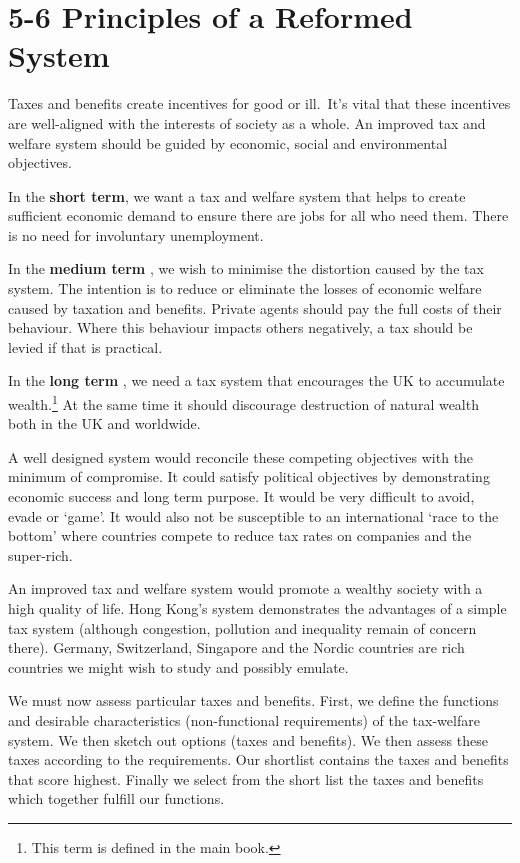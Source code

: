\documentclass[]{tufte-handout}
\begin{document}
\hypertarget{principles-of-a-reformed-system}{%
\section{5-6 Principles of a Reformed
System}\label{principles-of-a-reformed-system}}

Taxes and benefits create incentives for good or ill.~It's vital that
these incentives are well-aligned with the interests of society as a
whole. An improved tax and welfare system should be guided by economic,
social and environmental objectives.

In the \textbf{short term}, we want a tax and welfare system that helps
to create sufficient economic demand to ensure there are jobs for all
who need them. There is no need for involuntary unemployment.

In the \textbf{medium term} , we wish to minimise the distortion caused
by the tax system. The intention is to reduce or eliminate the losses of
economic welfare caused by taxation and benefits. Private agents should
pay the full costs of their behaviour. Where this behaviour impacts
others negatively, a tax should be levied if that is practical.

In the \textbf{long term} , we need a tax system that encourages the UK
to accumulate wealth.\footnote{This term is defined in the main book.}
At the same time it should discourage destruction of natural wealth both
in the UK and worldwide.

A well designed system would reconcile these competing objectives with
the minimum of compromise. It could satisfy political objectives by
demonstrating economic success and long term purpose. It would be very
difficult to avoid, evade or `game'. It would also not be susceptible to
an international `race to the bottom' where countries compete to reduce
tax rates on companies and the super-rich.

An improved tax and welfare system would promote a wealthy society with
a high quality of life. Hong Kong's system demonstrates the advantages
of a simple tax system (although congestion, pollution and inequality
remain of concern there). Germany, Switzerland, Singapore and the Nordic
countries are rich countries we might wish to study and possibly
emulate.

We must now assess particular taxes and benefits. First, we define the
functions and desirable characteristics (non-functional requirements) of
the tax-welfare system. We then sketch out options (taxes and benefits).
We then assess these taxes according to the requirements. Our shortlist
contains the taxes and benefits that score highest. Finally we select
from the short list the taxes and benefits which together fulfill our
functions.
\end{document}
